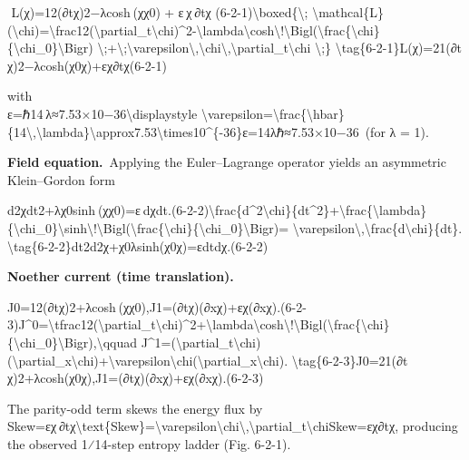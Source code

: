 \documentclass[]{article}
\begin{document}
  L(χ)=12(∂tχ)2−λcosh⁡ ⁣(χχ0)  +  ε χ ∂tχ  (6-2-1)\textbackslash{}boxed\{\textbackslash{};
\textbackslash{}mathcal\{L\}(\textbackslash{}chi)=\textbackslash{}frac12(\textbackslash{}partial\_t\textbackslash{}chi)\^{}2-\textbackslash{}lambda\textbackslash{}cosh\textbackslash{}!\textbackslash{}Bigl(\textbackslash{}frac\{\textbackslash{}chi\}\{\textbackslash{}chi\_0\}\textbackslash{}Bigr)
\textbackslash{};+\textbackslash{};\textbackslash{}varepsilon\textbackslash{},\textbackslash{}chi\textbackslash{},\textbackslash{}partial\_t\textbackslash{}chi
\textbackslash{};\}
\textbackslash{}tag\{6-2-1\}L(χ)=21​(∂t​χ)2−λcosh(χ0​χ​)+εχ∂t​χ​(6-2-1)

with\\
ε=ℏ14 λ≈7.53×10−36\textbackslash{}displaystyle
\textbackslash{}varepsilon=\textbackslash{}frac\{\textbackslash{}hbar\}\{14\textbackslash{},\textbackslash{}lambda\}\textbackslash{}approx7.53\textbackslash{}times10\^{}\{-36\}ε=14λℏ​≈7.53×10−36 (for
λ = 1).

\textbf{Field equation.} Applying the Euler--Lagrange operator yields an
asymmetric Klein--Gordon form

d2χdt2+λχ0sinh⁡ ⁣(χχ0)=ε dχdt.(6-2-2)\textbackslash{}frac\{d\^{}2\textbackslash{}chi\}\{dt\^{}2\}+\textbackslash{}frac\{\textbackslash{}lambda\}\{\textbackslash{}chi\_0\}\textbackslash{}sinh\textbackslash{}!\textbackslash{}Bigl(\textbackslash{}frac\{\textbackslash{}chi\}\{\textbackslash{}chi\_0\}\textbackslash{}Bigr)=
\textbackslash{}varepsilon\textbackslash{},\textbackslash{}frac\{d\textbackslash{}chi\}\{dt\}.
\textbackslash{}tag\{6-2-2\}dt2d2χ​+χ0​λ​sinh(χ0​χ​)=εdtdχ​.(6-2-2)

\textbf{Noether current (time translation).}

J0=12(∂tχ)2+λcosh⁡ ⁣(χχ0),J1=(∂tχ)(∂xχ)+εχ(∂xχ).(6-2-3)J\^{}0=\textbackslash{}tfrac12(\textbackslash{}partial\_t\textbackslash{}chi)\^{}2+\textbackslash{}lambda\textbackslash{}cosh\textbackslash{}!\textbackslash{}Bigl(\textbackslash{}frac\{\textbackslash{}chi\}\{\textbackslash{}chi\_0\}\textbackslash{}Bigr),\textbackslash{}qquad
J\^{}1=(\textbackslash{}partial\_t\textbackslash{}chi)(\textbackslash{}partial\_x\textbackslash{}chi)+\textbackslash{}varepsilon\textbackslash{}chi(\textbackslash{}partial\_x\textbackslash{}chi).
\textbackslash{}tag\{6-2-3\}J0=21​(∂t​χ)2+λcosh(χ0​χ​),J1=(∂t​χ)(∂x​χ)+εχ(∂x​χ).(6-2-3)

The parity-odd term skews the energy flux by\\
Skew=εχ ∂tχ\textbackslash{}text\{Skew\}=\textbackslash{}varepsilon\textbackslash{}chi\textbackslash{},\textbackslash{}partial\_t\textbackslash{}chiSkew=εχ∂t​χ,
producing the observed 1⁄14-step entropy ladder (Fig. 6-2-1).
\end{document}
